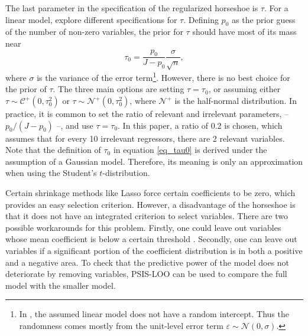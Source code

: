 The last parameter in the specification of the regularized horseshoe is $\tau$.
For a linear model, \cite{piironen_sparsity_2017} explore different specifications for $\tau$.
Defining $p_0$ as the prior guess of the number of non-zero variables, the prior for $\tau$ should have most of its mass near
\begin{equation}
    \displaystyle \tau_0 = \frac{p_0}{J-p_0}\frac{\sigma}{\sqrt n},
    \label{eq_tau0}
\end{equation}
where $\sigma$ is the variance of the error term\footnote{In \cite{piironen_sparsity_2017}, the assumed linear model does not have a random intercept. Thus the randomness comes mostly from the unit-level error term $\varepsilon \sim \mathcal N (0, \sigma)$.}.
However, there is no best choice for the prior of $\tau$. The three main options are setting $\tau = \tau_0$, or assuming either $\tau \sim \mathcal C^+(0, \tau_0^2)$ or $\tau \sim \mathcal N^+(0, \tau_0^2)$, where $\mathcal{N^+}$ is the half-normal distribution.
In practice, it is common to set the ratio of relevant and irrelevant parameters, – $p_0/(J - p_0)$ –, and use $\tau = \tau_0$.
In this paper, a ratio of 0.2 is chosen, which assumes that for every 10 irrelevant regressors, there are 2 relevant variables.
Note that the definition of $\tau_0$ in equation \ref{eq_tau0} is derived under the assumption of a Gaussian model.
Therefore, its meaning is only an approximation when using the Student's $t$-distribution.

Certain shrinkage methods like Lasso force certain coefficients to be zero, which provides an easy selection criterion.
However, a disadvantage of the horseshoe is that it does not have an integrated criterion to select variables. There are two possible workarounds for this problem.
Firstly, one could leave out variables whose mean coefficient is below a certain threshold \citep{piironen_sparsity_2017}.
Secondly, one can leave out variables if a significant portion of the coefficient distribution is in both a positive and a negative area.
To check that the predictive power of the model does not deteriorate by removing variables, PSIS-LOO can be used to compare the full model with the smaller model.

